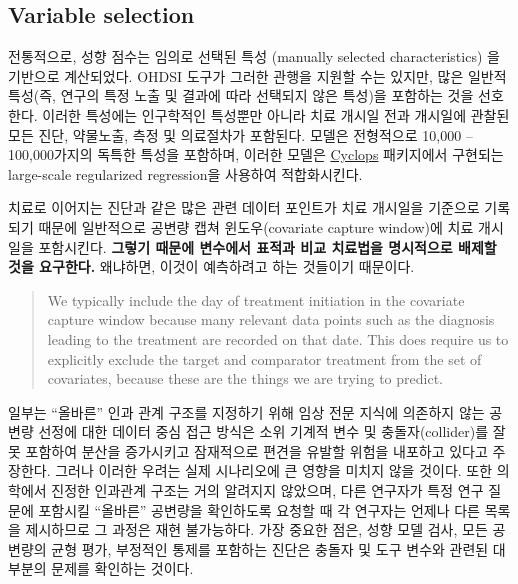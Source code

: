\documentclass[]{book}
\begin{document}
\hypertarget{VariableSelection}{%
\subsection{Variable selection}\label{VariableSelection}}

전통적으로, 성향 점수는 임의로 선택된 특성 (manually selected characteristics) 을 기반으로 계산되었다. OHDSI 도구가 그러한 관행을 지원할 수는 있지만, 많은 일반적 특성(즉, 연구의 특정 노출 및 결과에 따라 선택되지 않은 특성)을 포함하는 것을 선호한다. \citep{tian_2018} 이러한 특성에는 인구학적인 특성뿐만 아니라 치료 개시일 전과 개시일에 관찰된 모든 진단, 약물노출, 측정 및 의료절차가 포함된다. 모델은 전형적으로 10,000 -- 100,000가지의 독특한 특성을 포함하며, 이러한 모델은 \href{https://ohdsi.github.io/Cyclops/}{Cyclops} 패키지에서 구현되는 large-scale regularized regression\citep{suchard_2013}을 사용하여 적합화시킨다.

치료로 이어지는 진단과 같은 많은 관련 데이터 포인트가 치료 개시일을 기준으로 기록되기 때문에 일반적으로 공변량 캡쳐 윈도우(covariate capture window)에 치료 개시일을 포함시킨다. \textbf{그렇기 때문에 변수에서 표적과 비교 치료법을 명시적으로 배제할 것을 요구한다.} 왜냐하면, 이것이 예측하려고 하는 것들이기 때문이다.

\begin{quote}
We typically include the day of treatment initiation in the covariate capture window because many relevant data points such as the diagnosis leading to the treatment are recorded on that date. This does require us to explicitly exclude the target and comparator treatment from the set of covariates, because these are the things we are trying to predict.
\end{quote}

일부는 ``올바른'' 인과 관계 구조를 지정하기 위해 임상 전문 지식에 의존하지 않는 공변량 선정에 대한 데이터 중심 접근 방식은 소위 기계적 변수 및 충돌자(collider)를 잘못 포함하여 분산을 증가시키고 잠재적으로 편견을 유발할 위험을 내포하고 있다고 주장한다. \citep{hernan_2002} 그러나 이러한 우려는 실제 시나리오에 큰 영향을 미치지 않을 것이다.\citep{schneeweiss_2018} 또한 의학에서 진정한 인과관계 구조는 거의 알려지지 않았으며, 다른 연구자가 특정 연구 질문에 포함시킬 ``올바른'' 공변량을 확인하도록 요청할 때 각 연구자는 언제나 다른 목록을 제시하므로 그 과정은 재현 불가능하다. 가장 중요한 점은, 성향 모델 검사, 모든 공변량의 균형 평가, 부정적인 통제를 포함하는 진단은 충돌자 및 도구 변수와 관련된 대부분의 문제를 확인하는 것이다.  
\end{document}
